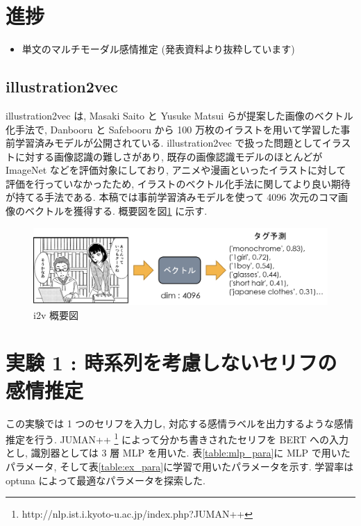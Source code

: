 \documentclass[twocolumn]{jarticle}     %
\begin{document}

\section{進捗}

\begin{itemize}
  \item 単文のマルチモーダル感情推定 (発表資料より抜粋しています)
\end{itemize}

\subsection{illustration2vec}
illustration2vec\cite{i2v} は, Masaki Saito と Yusuke Matsui らが提案した画像のベクトル化手法で, Danbooru と Safebooru から 100 万枚のイラストを用いて学習した事前学習済みモデルが公開されている. illustration2vec で扱った問題としてイラストに対する画像認識の難しさがあり, 既存の画像認識モデルのほとんどが ImageNet などを評価対象にしており, アニメや漫画といったイラストに対して評価を行っていなかったため, イラストのベクトル化手法に関してより良い期待が持てる手法である. 本稿では事前学習済みモデルを使って 4096 次元のコマ画像のベクトルを獲得する. 概要図を図\ref{fig:i2v} に示す.

\begin{figure}[!bth]
  \begin{center}
    \includegraphics[scale=0.7]{i2v.png}
    \caption{i2v 概要図} %
    \label{fig:i2v} %
  \end{center}
\end{figure}


\section{\small{実験 1 : 時系列を考慮しないセリフの感情推定}}
この実験では 1 つのセリフを入力し, 対応する感情ラベルを出力するような感情推定を行う. JUMAN++ \footnote{http://nlp.ist.i.kyoto-u.ac.jp/index.php?JUMAN++} によって分かち書きされたセリフを BERT への入力とし, 識別器としては 3 層 MLP を用いた. 表\ref{table:mlp_para}に MLP で用いたパラメータ, そして表\ref{table:ex_para}に学習で用いたパラメータを示す. 学習率は optuna によって最適なパラメータを探索した.
\end{document}
